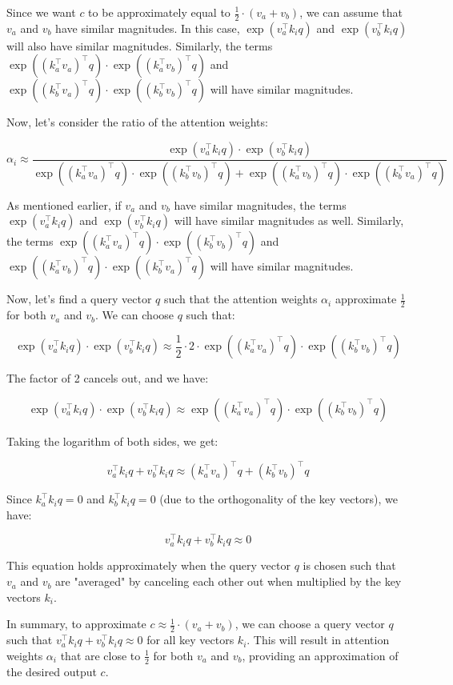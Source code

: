 \documentclass[a4paper]{article}
\begin{document}
Since we want $c$ to be approximately equal to $\frac{1}{2} \cdot (v_a + v_b)$, we can assume that $v_a$ and $v_b$ have similar magnitudes. In this case, $\exp(v_a^\top k_i q)$ and $\exp(v_b^\top k_i q)$ will also have similar magnitudes. Similarly, the terms $\exp((k_a^\top v_a)^\top q) \cdot \exp((k_a^\top v_b)^\top q)$ and $\exp((k_b^\top v_a)^\top q) \cdot \exp((k_b^\top v_b)^\top q)$ will have similar magnitudes.

Now, let's consider the ratio of the attention weights:

\[
\alpha_i \approx \frac{{\exp(v_a^\top k_i q) \cdot \exp(v_b^\top k_i q)}}{{\exp((k_a^\top v_a)^\top q) \cdot \exp((k_b^\top v_b)^\top q) + \exp((k_a^\top v_b)^\top q) \cdot \exp((k_b^\top v_a)^\top q)}}
\]

As mentioned earlier, if $v_a$ and $v_b$ have similar magnitudes, the terms $\exp(v_a^\top k_i q)$ and $\exp(v_b^\top k_i q)$ will have similar magnitudes as well. Similarly, the terms $\exp((k_a^\top v_a)^\top q) \cdot \exp((k_b^\top v_b)^\top q)$ and $\exp((k_a^\top v_b)^\top q) \cdot \exp((k_b^\top v_a)^\top q)$ will have similar magnitudes.

Now, let's find a query vector $q$ such that the attention weights $\alpha_i$ approximate $\frac{1}{2}$ for both $v_a$ and $v_b$. We can choose $q$ such that:

\[
\exp(v_a^\top k_i q) \cdot \exp(v_b^\top k_i q) \approx \frac{1}{2} \cdot 2 \cdot \exp((k_a^\top v_a)^\top q) \cdot \exp((k_b^\top v_b)^\top q)
\]

The factor of 2 cancels out, and we have:

\[
\exp(v_a^\top k_i q) \cdot \exp(v_b^\top k_i q) \approx \exp((k_a^\top v_a)^\top q) \cdot \exp((k_b^\top v_b)^\top q)
\]

Taking the logarithm of both sides, we get:

\[
v_a^\top k_i q + v_b^\top k_i q \approx (k_a^\top v_a)^\top q + (k_b^\top v_b)^\top q
\]

Since $k_a^\top k_i q = 0$ and $k_b^\top k_i q = 0$ (due to the orthogonality of the key vectors), we have:

\[
v_a^\top k_i q + v_b^\top k_i q \approx 0
\]

This equation holds approximately when the query vector $q$ is chosen such that $v_a$ and $v_b$ are "averaged" by canceling each other out when multiplied by the key vectors $k_i$.

In summary, to approximate $c \approx \frac{1}{2} \cdot (v_a + v_b)$, we can choose a query vector $q$ such that $v_a^\top k_i q + v_b^\top k_i q \approx 0$ for all key vectors $k_i$. This will result in attention weights $\alpha_i$ that are close to $\frac{1}{2}$ for both $v_a$ and $v_b$, providing an approximation of the desired output $c$.
\end{document}
